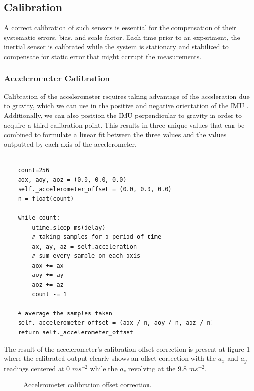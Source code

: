 \subsection{Calibration}

A correct calibration of such sensors is essential for the compensation of their systematic errors, bias, and scale factor. Each time prior to an experiment, the inertial sensor is calibrated while the system is stationary and stabilized to compensate for static error that might corrupt the measurements.

\subsubsection{Accelerometer Calibration}

Calibration of the accelerometer requires taking advantage of the acceleration due to gravity, which we can use in the positive and negative orientation of the IMU \cite{won2009triaxial}. Additionally, we can also position the IMU perpendicular to gravity in order to acquire a third calibration point. This results in three unique values that can be combined to formulate a linear fit between the three values and the values outputted by each axis of the accelerometer.

\lstset{language=Python}
\begin{lstlisting}[frame=single]  % Start your code-block

    count=256
    aox, aoy, aoz = (0.0, 0.0, 0.0)
    self._accelerometer_offset = (0.0, 0.0, 0.0)
    n = float(count)

    while count:
        utime.sleep_ms(delay)
        # taking samples for a period of time
        ax, ay, az = self.acceleration
        # sum every sample on each axis
        aox += ax
        aoy += ay
        aoz += az 
        count -= 1

    # average the samples taken
    self._accelerometer_offset = (aox / n, aoy / n, aoz / n)
    return self._accelerometer_offset
\end{lstlisting}

The result of the accelerometer's calibration offset correction is present at figure \ref{fig:accelerometer_calibration} where the calibrated output clearly shows an offset correction with the $a_x$ and $a_y$ readings centered at 0 $ms^{-2}$ while the $a_z$ revolving at the 9.8 $ms^{-2}$.

\begin{figure}[!h]
    \centering
    \resizebox{0.8\linewidth}{!}{}
    \caption{Accelerometer calibration offset correction.}
    \label{fig:accelerometer_calibration}
\end{figure}

